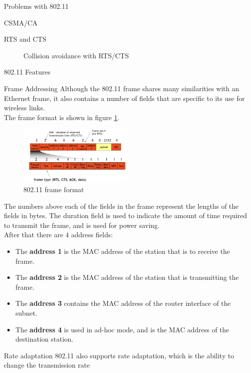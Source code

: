 \begin{section}{Problems with 802.11}
\begin{subsection}{CSMA/CA}
\begin{subsubsection}{RTS and CTS}
\begin{figure}[h]
        \caption{Collision avoidance with RTS/CTS}
      \end{figure}

    \end{subsubsection}

  \end{subsection}
\end{section}
\begin{section}{802.11 Features}
  \begin{subsection}{Frame Addressing}
    Although the 802.11 frame shares many similarities with an Ethernet frame, it also contains a 
    number of fields that are specific to its use for wireless links.\\
    The frame format is shown in figure \ref{fig:80211 frame format}.
    \begin{figure}[h]
      \centering
      \includegraphics[width=0.5\textwidth]{img/wireless/802.11 frame.png.png}
      \caption{802.11 frame format}
      \label{fig:80211 frame format}
    \end{figure}
  \end{subsection}
  The numbers above each of the fields in the frame represent the lengths of the fields in bytes.
  The duration field is used to indicate the amount of time required to transmit the frame, and is 
  used for power saving.\\
  After that there are 4 address fields:
  \begin{itemize}
    \item The \textbf{address 1} is the MAC address of the station that is to receive the frame.
    \item The \textbf{address 2} is the MAC address of the station that is transmitting 
      the frame.
    \item The \textbf{address 3} contains the MAC address of the router interface of the subnet.
    \item The \textbf{address 4} is used in ad-hoc mode, and is the MAC address of the 
      destination station.
  \end{itemize}
  \begin{subsection}{Rate adaptation}
    802.11 also supports rate adaptation, which is the ability to change the transmission rate 

\end{subsection}
\end{section}
